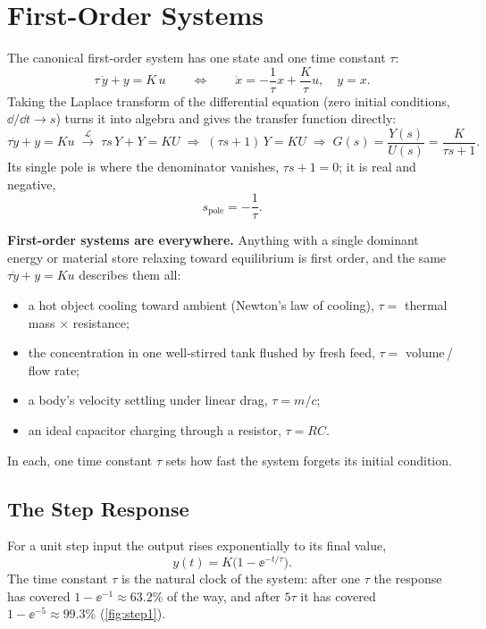 \section{First-Order Systems}
The canonical first-order system has one state and one time constant \(\tau\):
\[
\tau\,\dot{y}+y=K\,u
\qquad\Longleftrightarrow\qquad
\dot{x}=-\frac{1}{\tau}x+\frac{K}{\tau}u,\quad y=x .
\]
Taking the Laplace transform of the differential equation (zero initial
conditions, \(\dd/\dd t\to s\)) turns it into algebra and gives the transfer
function directly:
\[
\tau\dot y+y=Ku
\;\xrightarrow{\;\mathcal L\;}\;
\tau s\,Y+Y=KU
\;\Rightarrow\;
(\tau s+1)\,Y=KU
\;\Rightarrow\;
G(s)=\frac{Y(s)}{U(s)}=\frac{K}{\tau s+1}.
\]
Its single pole is where the denominator vanishes, \(\tau s+1=0\); it is real and
negative,
\[
s_{\text{pole}}=-\frac{1}{\tau}.
\]
\cite[pp.~32--37]{leigh2012control}

\begin{physicalbox}
\textbf{First-order systems are everywhere.} Anything with a single dominant
energy or material store relaxing toward equilibrium is first order, and the same
\(\tau\dot y+y=Ku\) describes them all:
\begin{itemize}
\item a hot object cooling toward ambient (Newton's law of cooling), \(\tau=\)
thermal mass \(\times\) resistance;
\item the concentration in one well-stirred tank flushed by fresh feed,
\(\tau=\) volume\,/\,flow rate;
\item a body's velocity settling under linear drag, \(\tau=m/c\);
\item an ideal capacitor charging through a resistor, \(\tau=RC\).
\end{itemize}
In each, one time constant \(\tau\) sets how fast the system forgets its initial
condition.
\end{physicalbox}

\subsection{The Step Response}
For a unit step input the output rises exponentially to its final value,
\[
y(t)=K\bigl(1-\ee^{-t/\tau}\bigr).
\]
The time constant \(\tau\) is the natural clock of the system:
after one \(\tau\) the response has covered \(1-\ee^{-1}\approx63.2\%\) of the
way, and after \(5\tau\) it has covered \(1-\ee^{-5}\approx99.3\%\)
\cite[pp.~32--37]{leigh2012control} (\cref{fig:step1}).

